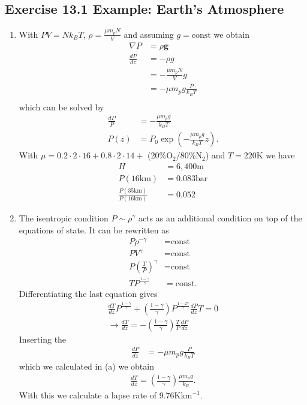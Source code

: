 \documentclass[10pt,a4paper]{book}
\theoremstyle{definition}
\begin{document}
\subsection{Exercise 13.1 Example: Earth's Atmosphere}
\begin{enumerate}[label=(\alph*)]
\item With $PV=Nk_BT$, $\rho=\frac{\mu m_p N}{V}$ and assuming $g=\text{const}$ we obtain
\begin{align}
    \nabla P&=\rho \mathbf{g}\\
    \frac{dP}{dz} &=-\rho g\\
    &=-\frac{\mu m_p N}{V} g\\
    &=-\mu m_p g\frac{P}{k_BT}\\
\end{align}
which can be solved by
\begin{align}
    \frac{dP}{P}&=-\frac{\mu m_p g}{k_BT}\\
    P(z)&=P_0\exp\left(-\frac{\mu m_p g}{k_B T}z\right).
\end{align}
With $\mu=0.2\cdot2\cdot16+0.8\cdot2\cdot14+$ (20\%O$_2$/80\%N$_2$) and $T=220$K we have
\begin{align}
    H&=6,400\text{m}\\
    P(16\text{km})&=0.083\text{bar}\\
    \frac{P(35\text{km})}{P(16\text{km})}&=0.052
\end{align}
\item The isentropic condition $P\sim\rho^\gamma$ acts as an additional condition on top of the equations of state. It can be rewritten as
\begin{align}
    P\rho^{-\gamma}&=\text{const}\\
    PV^{\gamma}&=\text{const}\\
    P\left(\frac{T}{P}\right)^{\gamma}&=\text{const}\\
    TP^\frac{1-\gamma}{\gamma}&=\text{const}.
\end{align}
Differentiating the last equation gives
\begin{align}
    \frac{dT}{dz}P^\frac{1-\gamma}{\gamma}+\left(\frac{1-\gamma}{\gamma}\right)P^{\frac{1-2\gamma}{\gamma}}\frac{dP}{dz}T=0\\
    \rightarrow\frac{dT}{dz}=-\left(\frac{1-\gamma}{\gamma}\right)\frac{T}{P}\frac{dP}{dz}
\end{align}
Inserting the
\begin{align}
    \frac{dP}{dz}&=-\mu m_p g\frac{P}{k_BT}
\end{align}
which we calculated in (a) we obtain
\begin{align}
    \frac{dT}{dz}=\left(\frac{1-\gamma}{\gamma}\right)\frac{\mu m_p g}{k_B}.
\end{align}
With this we calculate a lapse rate of 9.76K\;km$^{-1}$.
\end{enumerate}
\end{document}
